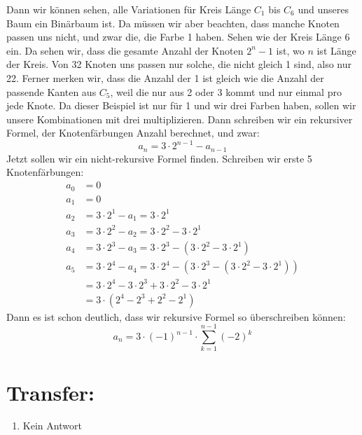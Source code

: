         Dann wir können sehen, alle Variationen für Kreis Länge $C_1$ bis $C_6$ und unseres Baum ein 
        Binärbaum ist. Da müssen wir aber beachten, dass manche Knoten passen uns nicht, und zwar die, 
        die Farbe 1 haben. Sehen wie der Kreis Länge 6 ein. Da sehen wir, dass die gesamte Anzahl der 
        Knoten $2^n-1$ ist, wo $n$ ist Länge der Kreis. Von 32 Knoten uns passen nur solche, die nicht 
        gleich 1 sind, also nur 22. Ferner merken wir, dass die Anzahl der 1 ist gleich wie die Anzahl 
        der passende Kanten aus $C_5$, weil die nur aus 2 oder 3 kommt und nur einmal pro jede Knote. 
        Da dieser Beispiel ist nur für 1 und wir drei Farben haben, sollen wir unsere Kombinationen 
        mit drei multiplizieren. Dann schreiben wir ein rekursiver Formel, der Knotenfärbungen Anzahl 
        berechnet, und zwar: $$ a_n = 3\cdot 2^{n-1} - a_{n-1} $$
        Jetzt sollen wir ein nicht-rekursive Formel finden. Schreiben wir erste 5 Knotenfärbungen:
        \begin{align*}
            a_0 &= 0\\
            a_1 &= 0\\
            a_2 &= 3\cdot 2^1 - a_1 = 3\cdot 2^1\\
            a_3 &= 3\cdot 2^2 - a_2 = 3\cdot 2^2 - 3\cdot 2^1\\
            a_4 &= 3\cdot 2^3 - a_3 = 3\cdot 2^3 - (3\cdot 2^2 - 3\cdot 2^1)\\
            a_5 &= 3\cdot 2^4 - a_4 = 3\cdot 2^4 - (3\cdot 2^3 - (3\cdot 2^2 - 3\cdot 2^1))\\
            &= 3\cdot 2^4 - 3\cdot 2^3 + 3\cdot 2^2 - 3\cdot 2^1\\
            &= 3\cdot (2^4 - 2^3 + 2^2 - 2^1)
        \end{align*} 
        Dann es ist schon deutlich, dass wir rekursive Formel so überschreiben können:
        $$ a_n = 3 \cdot (-1)^{n-1} \cdot \sum_{k=1}^{n-1}(-2)^k$$
    \section*{Transfer:}
    \begin{enumerate}[label=(\alph*)]
    	\item Kein Antwort
    \end{enumerate}
